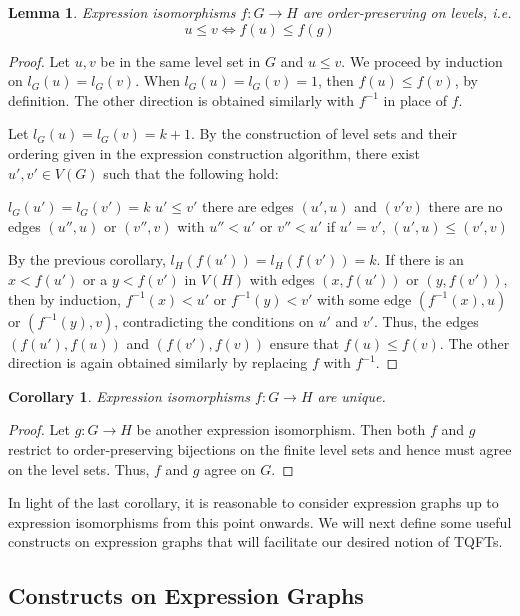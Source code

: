 \documentclass{amsart}
\renewcommand{\to}[1][]{\stackrel{#1}{\longrightarrow}}
\newcommand{\li}[1][]{\ifthenelse{\equal{#1}{}}{\item}{\item \label{#1}}}
\newenvironment{enmrt}{
  \enumerate[(i)]
  \setlength{\itemsep}{0pt}
}{
  \endenumerate
}
\numberwithin{thm}{section}
\newtheorem{lem}[thm]{Lemma}
\newtheorem{cor}[thm]{Corollary}
\theoremstyle{definition}
\begin{document}
\begin{lem}
Expression isomorphisms $f : G \to H$ are order-preserving on levels, i.e.
\[
  u \leq v \iff f(u) \leq f(g)
\]
\end{lem}
\begin{proof}
Let $u, v$ be in the same level set in $G$ and $u \leq v$. We proceed by
induction on $l_G(u) = l_G(v)$. When $l_G(u) = l_G(v) = 1$, then
$f(u) \leq f(v)$, by definition. The other direction is obtained similarly with
$f^{-1}$ in place of $f$.

Let $l_G(u) = l_G(v) = k + 1$. By the construction of level sets and their
ordering given in the expression construction algorithm, there exist
$u', v' \in V(G)$ such that the following hold:
\begin{enmrt}
\li $l_G(u') = l_G(v') = k$
\li $u' \leq v'$
\li there are edges $(u', u)$ and $(v' v)$
\li there are no edges $(u'', u)$ or $(v'', v)$ with $u'' < u'$ or $v'' < u'$
\li if $u' = v'$, $(u', u) \leq (v', v)$
\end{enmrt}
By the previous corollary, $l_H(f(u')) = l_H(f(v')) = k$.
If there is an $x < f(u')$ or a $y < f(v')$ in $V(H)$ with edges
$(x, f(u'))$ or $(y, f(v'))$, then by induction, $f^{-1}(x) < u'$ or
$f^{-1}(y) < v'$ with some edge $(f^{-1}(x), u)$ or $(f^{-1}(y), v)$,
contradicting the conditions on $u'$ and $v'$. Thus, the edges $(f(u'), f(u))$
and $(f(v'), f(v))$ ensure that $f(u) \leq f(v)$. The other direction is again
obtained similarly by replacing $f$ with $f^{-1}$.
\end{proof}

\begin{cor}\label{cor:expiso_unique}
Expression isomorphisms $f : G \to H$ are unique.
\end{cor}
\begin{proof}
Let $g : G \to H$ be another expression isomorphism. Then both $f$ and $g$
restrict to order-preserving bijections on the finite level sets and hence must
agree on the level sets. Thus, $f$ and $g$ agree on $G$.
\end{proof}

In light of the last corollary, it is reasonable to consider expression graphs
up to expression isomorphisms from this point onwards. We will next define some
useful constructs on expression graphs that will facilitate our desired notion
of TQFTs.


%

\subsection{Constructs on Expression Graphs}
\end{document}

